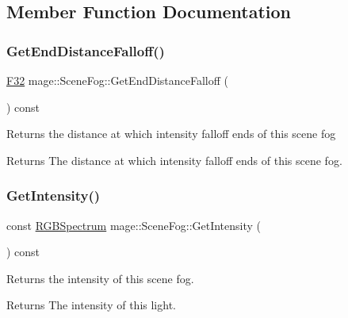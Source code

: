 \subsection{Member Function Documentation}
\hypertarget{structmage_1_1_scene_fog_a312d19b9e3217c4aae6b9d2c831c860a}{}\label{structmage_1_1_scene_fog_a312d19b9e3217c4aae6b9d2c831c860a} 
\subsubsection{\texorpdfstring{Get\+End\+Distance\+Falloff()}{GetEndDistanceFalloff()}}
{\footnotesize\ttfamily \hyperlink{namespacemage_aa97e833b45f06d60a0a9c4fc22ae02c0}{F32} mage\+::\+Scene\+Fog\+::\+Get\+End\+Distance\+Falloff (\begin{DoxyParamCaption}{ }\end{DoxyParamCaption}) const\hspace{0.3cm}{\ttfamily [noexcept]}}

Returns the distance at which intensity falloff ends of this scene fog

\begin{DoxyReturn}{Returns}
The distance at which intensity falloff ends of this scene fog. 
\end{DoxyReturn}
\hypertarget{structmage_1_1_scene_fog_ac383f82bf8e286ec3478a83fa857f04e}{}\label{structmage_1_1_scene_fog_ac383f82bf8e286ec3478a83fa857f04e} 
\subsubsection{\texorpdfstring{Get\+Intensity()}{GetIntensity()}}
{\footnotesize\ttfamily const \hyperlink{structmage_1_1_r_g_b_spectrum}{R\+G\+B\+Spectrum} mage\+::\+Scene\+Fog\+::\+Get\+Intensity (\begin{DoxyParamCaption}{ }\end{DoxyParamCaption}) const\hspace{0.3cm}{\ttfamily [noexcept]}}

Returns the intensity of this scene fog.

\begin{DoxyReturn}{Returns}
The intensity of this light. 
\end{DoxyReturn}
\hypertarget{structmage_1_1_scene_fog_a8085b84b90e907751a0db99f9a26a3ef}{}\label{structmage_1_1_scene_fog_a8085b84b90e907751a0db99f9a26a3ef} 
